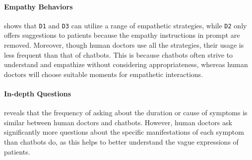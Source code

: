 
\paragraph{Empathy Behaviors}
 shows that \texttt{D1} and \texttt{D3} can utilize a range of empathetic strategies, while \texttt{D2} only offers suggestions to patients because the empathy instructions in prompt are removed. Moreover, though human doctors use all the strategies, their usage is less frequent than that of chatbots. This is because chatbots often strive to understand and empathize without considering appropriateness, whereas human doctors will choose suitable moments for empathetic interactions.


\paragraph{In-depth Questions}
 reveals that the frequency of asking about the duration or cause of symptoms is similar between human doctors and chatbots. However, human doctors ask significantly more questions about the specific manifestations of each symptom than chatbots do, as this helps to better understand the vague expressions of patients.

